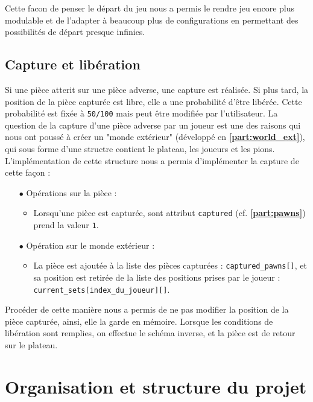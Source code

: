         Cette facon de penser le départ du jeu nous a permis le rendre jeu encore plus modulable et de l'adapter à beaucoup plus de configurations en permettant des possibilités de départ presque infinies.
            
    \subsection{Capture et libération}
        Si une pièce atterit sur une pièce adverse, une capture est réalisée. Si plus tard, la position de la pièce capturée est libre, elle a une probabilité d'être libérée. Cette probabilité est fixée à \texttt{50/100} mais peut être modifiée par l'utilisateur. La question de la capture d'une pièce adverse par un joueur est une des raisons qui nous ont poussé à créer un "monde extérieur" (développé en \textbf{\ref{part:world_ext}}), qui sous forme d'une structre contient le plateau, les joueurs et les pions.
        \medbreak
        \noindent L'implémentation de cette structure nous a permis d'implémenter la capture de cette façon :
        \begin{itemize}
            \item[$\bullet$] Opérations sur la pièce :
            \begin{itemize}
                \item Lorsqu'une pièce est capturée, sont attribut \texttt{captured} (cf. \textbf{\ref{part:pawns}}) prend la valeur \texttt{1}.
            \end{itemize}
            \item[$\bullet$] Opération sur le monde extérieur :
            \begin{itemize}
                \item La pièce est ajoutée à la liste des pièces capturées : \texttt{captured\_pawns[]}, et sa position est retirée de la liste des positions prises par le joueur : \texttt{current\_sets[index\_du\_joueur][]}.
            \end{itemize}
        \end{itemize}
        \medbreak
        Procéder de cette manière nous a permis de ne pas modifier la position de la pièce capturée, ainsi, elle la garde en mémoire. Lorsque les conditions de libération sont remplies, on effectue le schéma inverse, et la pièce est de retour sur le plateau.
        \newpage

\section{Organisation et structure du projet}\

